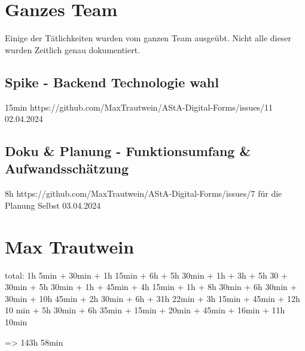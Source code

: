 \section{Ganzes Team}
Einige der Tätlichkeiten wurden vom ganzen Team ausgeübt.
Nicht alle dieser wurden Zeitlich genau dokumentiert.

\subsection{Spike - Backend Technologie wahl }
15min
https://github.com/MaxTrautwein/AStA-Digital-Forms/issues/11
02.04.2024

\subsection{Doku & Planung - Funktionsumfang & Aufwandsschätzung}
8h
https://github.com/MaxTrautwein/AStA-Digital-Forms/issues/7
für die Planung Selbst
03.04.2024

\section{Max Trautwein}\label{sec:max-trautwein}

total: 1h 5min + 30min + 1h 15min + 6h + 5h 30min + 1h + 3h + 5h 30 + 30min + 5h 30min + 1h + 45min + 4h 15min + 1h
+ 8h 30min + 6h 30min + 30min + 10h 45min + 2h 30min + 6h + 31h 22min + 3h 15min + 45min + 12h 10 min + 5h 30min + 6h 35min
+ 15min + 20min + 45min + 16min + 11h 10min

=> 143h 58min

